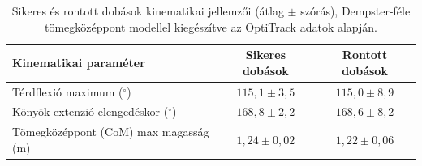 \begin{table}[!ht]
\centering
\caption{Sikeres és rontott dobások kinematikai jellemzői (átlag $\pm$ szórás), Dempster-féle tömegközéppont modellel kiegészítve az OptiTrack adatok alapján.}
\label{tab:kinematics}
\begin{tabular}{lcc}
\toprule
\textbf{Kinematikai paraméter} & \textbf{Sikeres dobások} & \textbf{Rontott dobások} \\
\midrule
Térdflexió maximum ($^\circ$) & $115,1 \pm 3,5$ & $115,0 \pm 8,9$ \\
Könyök extenzió elengedéskor ($^\circ$) & $168,8 \pm 2,2$ & $168,6 \pm 8,2$ \\
Tömegközéppont (CoM) max magasság (m) & $1,24 \pm 0,02$ & $1,22 \pm 0,06$ \\
\bottomrule
\end{tabular}
\end{table}

